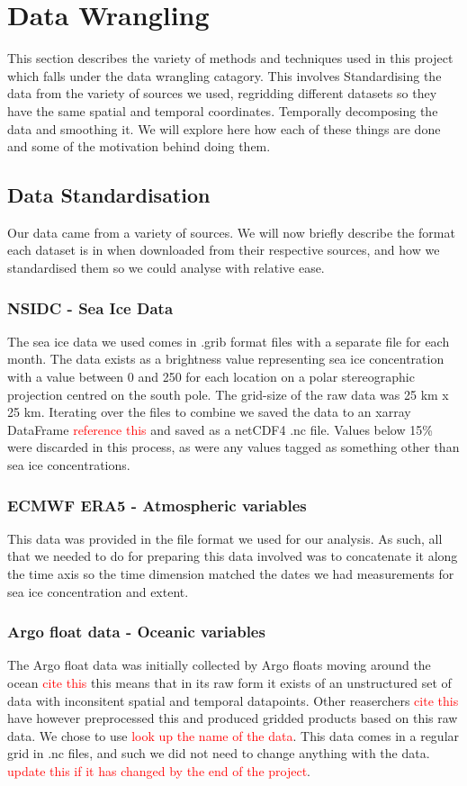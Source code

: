 \section{Data Wrangling}

This section describes the variety of methods and techniques used in this project which falls under the data wrangling catagory. This involves Standardising the data from the variety of sources we used, regridding different datasets so they have the same spatial and temporal coordinates. Temporally decomposing the data and smoothing it. We will explore here how each of these things are done and some of the motivation behind doing them.

\subsection{Data Standardisation}
Our data came from a variety of sources. We will now briefly describe the format each dataset is in when downloaded from their respective sources, and how we standardised them so we could analyse with relative ease.

\subsubsection*{NSIDC - Sea Ice Data}
The sea ice data we used comes in .grib format files with a separate file for each month. The data exists as a brightness value representing sea ice concentration with a value between 0 and 250 for each location on a polar stereographic projection centred on the south pole. The grid-size of the raw data was 25 km x 25 km. Iterating over the files to combine we saved the data to an xarray DataFrame \textcolor{red}{reference this} and saved as a netCDF4 .nc file. Values below 15\% were discarded in this process, as were any values tagged as something other than sea ice concentrations. 

\subsubsection*{ECMWF ERA5 - Atmospheric variables}
This data was provided in the file format we used for our analysis. As such, all that we needed to do for preparing this data involved was to concatenate it along the time axis so the time dimension matched the dates we had measurements for sea ice concentration and extent.

\subsubsection*{Argo float data - Oceanic variables}
The Argo float data was initially collected by Argo floats moving around the ocean \textcolor{red}{cite this} this means that in its raw form it exists of an unstructured set of data with inconsitent spatial and temporal datapoints. Other reaserchers \textcolor{red}{cite this} have however preprocessed this and produced gridded products based on this raw data. We chose to use  \textcolor{red}{look up the name of the data}. This data comes in a regular grid in .nc files, and such we did not need to change anything with the data. \textcolor{red}{update this if it has changed by the end of the project}.


